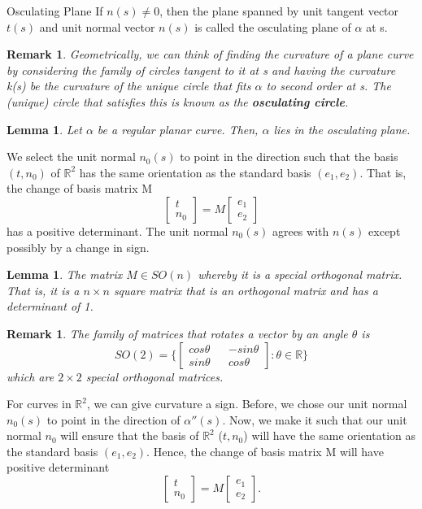 \documentclass[twoside]{article}
\newtheorem{lemma}[theorem]{Lemma}
\newtheorem{remark}[theorem]{Remark}
\begin{document}
\begin{definition_exam}{Osculating Plane}{} If $n(s) \neq 0$, then the plane spanned by unit tangent vector $t(s)$ and unit normal vector $n(s)$ is called the osculating plane of $\alpha$ at s.
\end{definition_exam}

\begin{remark}Geometrically, we can think of finding the curvature of a plane curve by considering the family of circles tangent to it at s and having the curvature k(s) be the curvature of the unique circle that fits $\alpha$ to second order at s. The (unique) circle that satisfies this is known as the \textbf{osculating circle}.
\end{remark}

\begin{lemma}
Let $\alpha$ be a regular planar curve. Then, $\alpha$ lies in the osculating plane.
\end{lemma}

We select the unit normal $n_0(s)$ to point in the direction such that the basis $(t, n_0)$ of $\mathbb{R}^2$ has the same orientation as the standard basis $(e_1,e_2)$. That is, the change of basis matrix M 
$$
\begin{bmatrix}
t\\
n_0
\end{bmatrix}
= M 
\begin{bmatrix}
e_1\\
e_2
\end{bmatrix}
$$
has a positive determinant. The unit normal $n_0(s)$ agrees with $n(s)$ except possibly by a change in sign.

\begin{lemma}The matrix $M \in SO(n)$ whereby it is a special orthogonal matrix. That is, it is a $n \times n$ square matrix that is an orthogonal matrix and has a determinant of 1.
\end{lemma}

\begin{remark}The family of matrices that rotates a vector by an angle $\theta$ is 
$$
SO(2) = \bigg\{ \begin{bmatrix}cos \theta && -sin \theta \\sin \theta && cos \theta \end{bmatrix}: \theta \in \mathbb{R} \bigg\}
$$
which are $2 \times 2$ special orthogonal matrices.
\end{remark}

For curves in $\mathbb{R}^2$, we can give curvature a sign. Before, we chose our unit normal $n_0(s)$ to point in the direction of $\alpha''(s)$. Now, we make it such that our unit normal $n_0$ will ensure that the basis of $\mathbb{R}^2$ ($t, n_0$) will have the same orientation as the standard basis $(e_1,e_2).$ Hence, the change of basis matrix M will have positive determinant 
$$
\begin{bmatrix}
t\\
n_0
\end{bmatrix}
= M
\begin{bmatrix}
e_1\\
e_2
\end{bmatrix}.
$$
\end{document}
